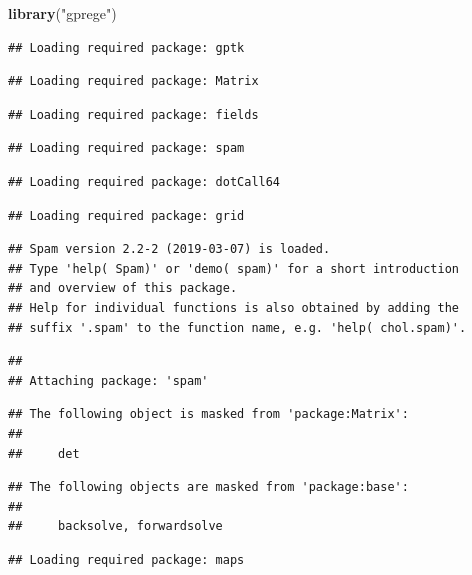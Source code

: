 \documentclass[]{article}
\newenvironment{Shaded}{\begin{snugshade}}{\end{snugshade}}
\newcommand{\KeywordTok}[1]{\textcolor[rgb]{0.13,0.29,0.53}{\textbf{#1}}}
\newcommand{\StringTok}[1]{\textcolor[rgb]{0.31,0.60,0.02}{#1}}
\newcommand{\NormalTok}[1]{#1}
\begin{document}
\begin{Shaded}
\begin{Highlighting}[]
\KeywordTok{library}\NormalTok{(}\StringTok{"gprege"}\NormalTok{)}
\end{Highlighting}
\end{Shaded}

\begin{verbatim}
## Loading required package: gptk
\end{verbatim}

\begin{verbatim}
## Loading required package: Matrix
\end{verbatim}

\begin{verbatim}
## Loading required package: fields
\end{verbatim}

\begin{verbatim}
## Loading required package: spam
\end{verbatim}

\begin{verbatim}
## Loading required package: dotCall64
\end{verbatim}

\begin{verbatim}
## Loading required package: grid
\end{verbatim}

\begin{verbatim}
## Spam version 2.2-2 (2019-03-07) is loaded.
## Type 'help( Spam)' or 'demo( spam)' for a short introduction 
## and overview of this package.
## Help for individual functions is also obtained by adding the
## suffix '.spam' to the function name, e.g. 'help( chol.spam)'.
\end{verbatim}

\begin{verbatim}
## 
## Attaching package: 'spam'
\end{verbatim}

\begin{verbatim}
## The following object is masked from 'package:Matrix':
## 
##     det
\end{verbatim}

\begin{verbatim}
## The following objects are masked from 'package:base':
## 
##     backsolve, forwardsolve
\end{verbatim}

\begin{verbatim}
## Loading required package: maps
\end{verbatim}
\end{document}
